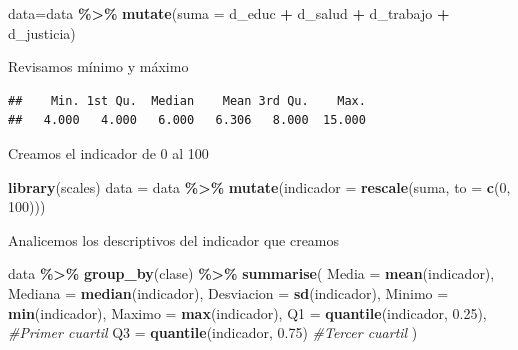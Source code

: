 \documentclass[
]{article}
\newenvironment{Shaded}{\begin{snugshade}}{\end{snugshade}}
\newcommand{\AttributeTok}[1]{\textcolor[rgb]{0.13,0.29,0.53}{#1}}
\newcommand{\CommentTok}[1]{\textcolor[rgb]{0.56,0.35,0.01}{\textit{#1}}}
\newcommand{\DecValTok}[1]{\textcolor[rgb]{0.00,0.00,0.81}{#1}}
\newcommand{\FloatTok}[1]{\textcolor[rgb]{0.00,0.00,0.81}{#1}}
\newcommand{\FunctionTok}[1]{\textcolor[rgb]{0.13,0.29,0.53}{\textbf{#1}}}
\newcommand{\NormalTok}[1]{#1}
\newcommand{\OtherTok}[1]{\textcolor[rgb]{0.56,0.35,0.01}{#1}}
\newcommand{\SpecialCharTok}[1]{\textcolor[rgb]{0.81,0.36,0.00}{\textbf{#1}}}
\begin{document}
\begin{Shaded}
\begin{Highlighting}[]
\NormalTok{data}\OtherTok{=}\NormalTok{data }\SpecialCharTok{\%\textgreater{}\%}
  \FunctionTok{mutate}\NormalTok{(}\AttributeTok{suma =}\NormalTok{ d\_educ }\SpecialCharTok{+}\NormalTok{ d\_salud }\SpecialCharTok{+}\NormalTok{ d\_trabajo }\SpecialCharTok{+}\NormalTok{ d\_justicia)}
\end{Highlighting}
\end{Shaded}

Revisamos mínimo y máximo

\begin{Shaded}
\end{Shaded}

\begin{verbatim}
##    Min. 1st Qu.  Median    Mean 3rd Qu.    Max. 
##   4.000   4.000   6.000   6.306   8.000  15.000
\end{verbatim}

Creamos el indicador de 0 al 100

\begin{Shaded}
\begin{Highlighting}[]
\FunctionTok{library}\NormalTok{(scales)}
\NormalTok{data }\OtherTok{=}\NormalTok{ data }\SpecialCharTok{\%\textgreater{}\%}
  \FunctionTok{mutate}\NormalTok{(}\AttributeTok{indicador =} \FunctionTok{rescale}\NormalTok{(suma, }\AttributeTok{to =} \FunctionTok{c}\NormalTok{(}\DecValTok{0}\NormalTok{, }\DecValTok{100}\NormalTok{)))}
\end{Highlighting}
\end{Shaded}

Analicemos los descriptivos del indicador que creamos

\begin{Shaded}
\begin{Highlighting}[]
\NormalTok{data }\SpecialCharTok{\%\textgreater{}\%} 
  \FunctionTok{group\_by}\NormalTok{(clase) }\SpecialCharTok{\%\textgreater{}\%} 
  \FunctionTok{summarise}\NormalTok{(}
    \AttributeTok{Media =} \FunctionTok{mean}\NormalTok{(indicador), }
    \AttributeTok{Mediana =} \FunctionTok{median}\NormalTok{(indicador), }
    \AttributeTok{Desviacion =} \FunctionTok{sd}\NormalTok{(indicador), }
    \AttributeTok{Minimo =} \FunctionTok{min}\NormalTok{(indicador), }
    \AttributeTok{Maximo =} \FunctionTok{max}\NormalTok{(indicador),}
    \AttributeTok{Q1 =} \FunctionTok{quantile}\NormalTok{(indicador, }\FloatTok{0.25}\NormalTok{), }\CommentTok{\#Primer cuartil}
    \AttributeTok{Q3 =} \FunctionTok{quantile}\NormalTok{(indicador, }\FloatTok{0.75}\NormalTok{) }\CommentTok{\#Tercer cuartil}
\NormalTok{  )}
\end{Highlighting}
\end{Shaded}
\end{document}
